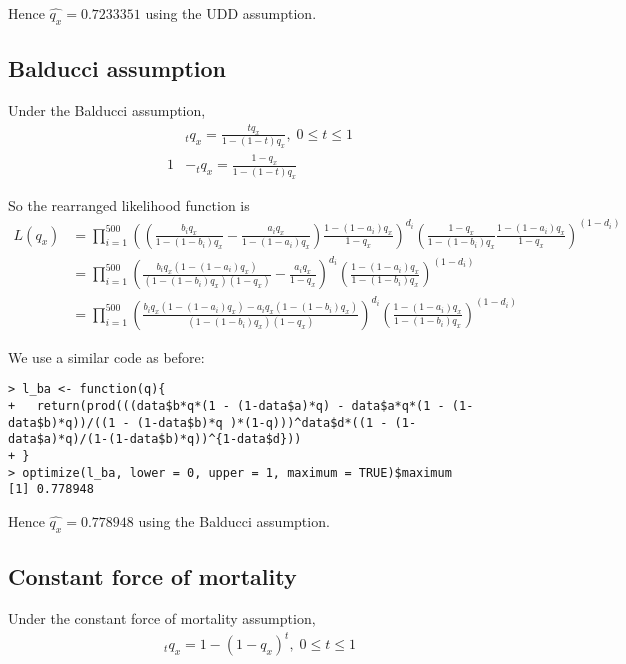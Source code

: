 \documentclass[a4paper,11pt]{article}
\theoremstyle{mytheor}
\begin{document}
Hence $\hat{q_x} = 0.7233351$ using the UDD assumption.

\subsection*{Balducci assumption}

Under the Balducci assumption,
\begin{align*}
   & _tq_x  = \frac{tq_x}{1-(1-t)q_x}, \; 0 \leq t \leq 1 \\
   1 & - _tq_x  = \frac{1-q_x}{1-(1-t)q_x}
\end{align*}

So the rearranged likelihood function is
\begin{align*}
    L(q_x) & = \prod_{i = 1}^{500}\left(\left(\frac{b_iq_x}{1-(1-b_i)q_x} - \frac{a_iq_x}{1-(1-a_i)q_x}\right) \frac{1-(1-a_i)q_x}{1-q_x}\right)^{d_i}\left(\frac{1-q_x}{1-(1-b_i)q_x}\frac{1-(1-a_i)q_x}{1-q_x}\right)^{(1-d_i)} \\
    & = \prod_{i = 1}^{500}\left(\frac{b_iq_x(1-(1-a_i)q_x)}{(1-(1-b_i)q_x)(1-q_x)} - \frac{a_iq_x}{1-q_x}\right)^{d_i}\left(\frac{1-(1-a_i)q_x}{1-(1-b_i)q_x}\right)^{(1-d_i)} \\
    & = \prod_{i = 1}^{500}\left(\frac{b_iq_x(1-(1-a_i)q_x) - a_iq_x(1-(1-b_i)q_x)}{(1-(1-b_i)q_x)(1-q_x)}\right)^{d_i}\left(\frac{1-(1-a_i)q_x}{1-(1-b_i)q_x}\right)^{(1-d_i)}
\end{align*}

We use a similar code as before:
\begin{lstlisting}[label={list:second},caption=Code to estimate $q_x$ under the Balducci assumption]
> l_ba <- function(q){
+   return(prod(((data$b*q*(1 - (1-data$a)*q) - data$a*q*(1 - (1-data$b)*q))/((1 - (1-data$b)*q )*(1-q)))^data$d*((1 - (1-data$a)*q)/(1-(1-data$b)*q))^{1-data$d}))
+ }
> optimize(l_ba, lower = 0, upper = 1, maximum = TRUE)$maximum
[1] 0.778948
\end{lstlisting}

Hence $\hat{q_x} = 0.778948$ using the Balducci assumption.

\subsection*{Constant force of mortality}

Under the constant force of mortality assumption,
\begin{align*}
    _tq_x = 1- (1-q_x)^t, \; 0\leq t \leq 1
\end{align*}
\end{document}
